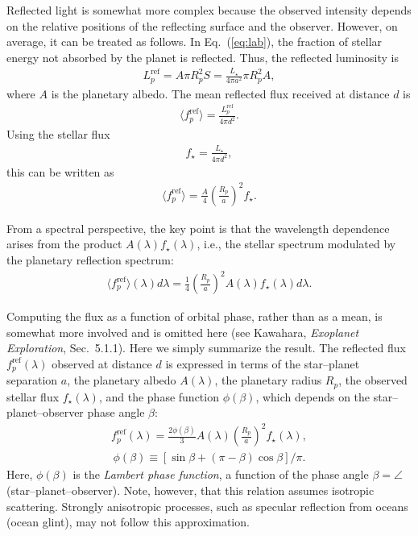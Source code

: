Reflected light is somewhat more complex because the observed intensity depends on the relative positions of the reflecting surface and the observer. However, on average, it can be treated as follows. In Eq.~(\ref{eq:lab}), the fraction of stellar energy not absorbed by the planet is reflected. Thus, the reflected luminosity is
\begin{align}
    L^\mathrm{ref}_p = A \pi R_p^2 S = \frac{L_\star}{4 \pi a^2} \pi R_p^2 A,
\end{align}
where $A$ is the planetary albedo. The mean reflected flux received at distance $d$ is
\begin{align}
    \langle f_{p}^\mathrm{ref} \rangle = \frac{ L^\mathrm{ref}_p}{4 \pi d^2}.
\end{align}
Using the stellar flux
\begin{align}
    f_\star = \frac{L_\star}{4 \pi d^2},
\end{align}
this can be written as
\begin{align}
    \langle f_{p}^\mathrm{ref} \rangle = \frac{A}{4} \left( \frac{R_p}{a} \right)^2 f_\star.
\end{align}

From a spectral perspective, the key point is that the wavelength dependence arises from the product $A(\lambda) f_\star(\lambda)$, i.e., the stellar spectrum modulated by the planetary reflection spectrum:
\begin{align}
    \langle f_{p}^\mathrm{ref} \rangle (\lambda) d \lambda = \frac{1}{4} \left( \frac{R_p}{a} \right)^2 A(\lambda) f_\star (\lambda) d \lambda.
\end{align}

Computing the flux as a function of orbital phase, rather than as a mean, is somewhat more involved and is omitted here (see Kawahara, \emph{Exoplanet Exploration}, Sec.~5.1.1). Here we simply summarize the result. The reflected flux $f_p^\mathrm{ref} (\lambda)$ observed at distance $d$ is expressed in terms of the star–planet separation $a$, the planetary albedo $A(\lambda)$, the planetary radius $R_p$, the observed stellar flux $f_\star(\lambda)$, and the phase function $\phi(\beta)$, which depends on the star–planet–observer phase angle $\beta$:
\begin{align}
\label{eq:refplanet}
f_p^\mathrm{ref} (\lambda) = \frac{2 \phi(\beta)}{3} A(\lambda) \left(\frac{R_p}{a}\right)^2 f_\star (\lambda),
\end{align}
\begin{align}
\label{eq:phaselambert}
\phi(\beta) \equiv [\sin{\beta} +  (\pi - \beta) \cos{\beta}]/\pi.
\end{align}
Here, $\phi(\beta)$ is the \emph{Lambert phase function}, a function of the phase angle $\beta = \angle$(star–planet–observer). Note, however, that this relation assumes isotropic scattering. Strongly anisotropic processes, such as specular reflection from oceans (ocean glint), may not follow this approximation.

